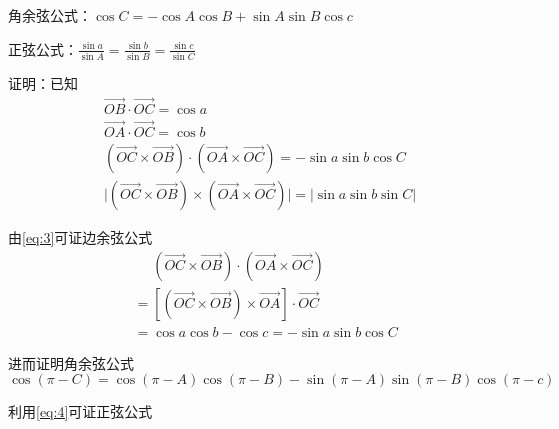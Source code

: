 \documentclass[UTF8]{ctexart}
\begin{document}
角余弦公式：$\cos{C}=-\cos{A}\cos{B}+\sin{A}\sin{B}\cos{c}$

正弦公式：$\frac{\sin{a}}{\sin{A}}=\frac{\sin{b}}{\sin{B}}=\frac{\sin{c}}{\sin{C}}$

证明：已知
\begin{gather}
	\overrightarrow{OB}\cdot\overrightarrow{OC}=\cos{a}\label{eq:1}\\
	\overrightarrow{OA}\cdot\overrightarrow{OC}=\cos{b}\label{eq:2}\\
	(\overrightarrow{OC}\times\overrightarrow{OB})\cdot(\overrightarrow{OA}\times\overrightarrow{OC})=-\sin{a}\sin{b}\cos{C}\label{eq:3}\\
	\vert(\overrightarrow{OC}\times\overrightarrow{OB})\times(\overrightarrow{OA}\times\overrightarrow{OC})\vert=\vert\sin{a}\sin{b}\sin{C}\label{eq:4}\vert
\end{gather}

由\eqref{eq:3}可证边余弦公式
\begin{equation}
	\begin{split}
		&\mathrel{\phantom{=}}(\overrightarrow{OC}\times\overrightarrow{OB})\cdot(\overrightarrow{OA}\times\overrightarrow{OC})\\
		&=[(\overrightarrow{OC}\times\overrightarrow{OB})\times\overrightarrow{OA}]\cdot\overrightarrow{OC}\\
		&=\cos{a}\cos{b}-\cos{c}=-\sin{a}\sin{b}\cos{C}
	\end{split}
\end{equation}

进而证明角余弦公式
\begin{equation}
	\cos{(\pi-C)}=\cos{(\pi-A)}\cos{(\pi-B)}-\sin{(\pi-A)}\sin{(\pi-B)}\cos{(\pi-c)}
\end{equation}

利用\eqref{eq:4}可证正弦公式
\end{document}
